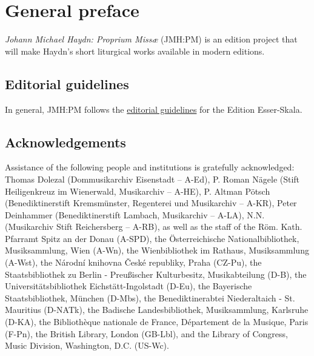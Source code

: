 \documentclass{ees}
\begin{document}

\setcounter{page}{1}

\tableofcontents

\chapter{General preface}

\textit{Johann Michael Haydn: Proprium Missæ} (JMH:PM) is an edition project that will make Haydn’s short liturgical works available in modern editions.


\section{Editorial guidelines}

In general, JMH:PM follows the \href{https://edition.esser-skala.at/about/editorial-guidelines/}{editorial guidelines} for the Edition Esser-Skala.


\section{Acknowledgements}

Assistance of the following people and institutions is gratefully acknowledged:
Thomas Dolezal (Dommusikarchiv Eisenstadt – A-Ed),
P. Roman Nägele (Stift Heiligenkreuz im Wienerwald, Musikarchiv – A-HE),
P. Altman Pötsch (Benediktinerstift Kremsmünster, Regenterei und Musikarchiv – A-KR),
Peter Deinhammer (Benediktinerstift Lambach, Musikarchiv – A-LA),
N.N. (Musikarchiv Stift Reichersberg – A-RB),
as well as the staff of
the Röm. Kath. Pfarramt Spitz an der Donau (A-SPD),
the Österreichische Nationalbibliothek, Musiksammlung, Wien (A-Wn),
the Wienbibliothek im Rathaus, Musiksammlung (A-Wst),
the Národní knihovna České republiky, Praha (CZ-Pu),
the Staatsbibliothek zu Berlin - Preußischer Kulturbesitz, Musikabteilung (D-B),
the Universitätsbibliothek Eichstätt-Ingolstadt (D-Eu),
the Bayerische Staatsbibliothek, München (D-Mbs),
the Benediktinerabtei Niederaltaich - St. Mauritius (D-NATk),
the Badische Landesbibliothek, Musiksammlung, Karlsruhe (D-KA),
the Bibliothèque nationale de France, Département de la Musique, Paris (F-Pn),
the British Library, London (GB-Lbl), and
the Library of Congress, Music Division, Washington, D.C. (US-Wc).


\clearpage
{}
\end{document}
